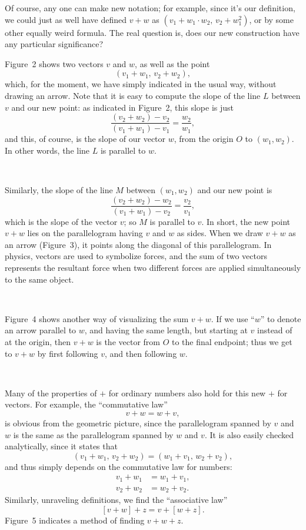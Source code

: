 Of course, any one can make new notation; for example, since it's our
definition, we could just as well have defined $v+w$ as
$(v_1+w_1\cdot w_2,\,v_2+w_1^2)$, or by some other equally weird formula. The
real question is, does our new construction have any particular significance?

Figure~2 shows two vectors $v$ and $w$, as well as the point
\[
(v_1+w_1,\,v_2+w_2),
\]
which, for the moment, we have simply indicated in the usual way, without
drawing an arrow. Note that it is easy to compute the slope of the line $L$
between $v$ and our new point: as indicated in Figure~2, this slope is just
\[
\frac{(v_2+w_2)-v_2}{(v_1+w_1)-v_1}=\frac{w_2}{w_1},
\]
and this, of course, is the slope of our vector $w$, from the origin $O$ to
$(w_1,w_2)$. In other words, the line $L$ is parallel to $w$.

\begin{center}
\\[0.6em]
\end{center}

Similarly, the slope of the line $M$ between $(w_1,w_2)$ and our new point is
\[
\frac{(v_2+w_2)-w_2}{(v_1+w_1)-v_2}=\frac{v_2}{v_1},
\]
which is the slope of the vector $v$; so $M$ is parallel to $v$. In short, the
new point $v+w$ lies on the parallelogram having $v$ and $w$ as sides. When we
draw $v+w$ as an arrow (Figure~3), it points along the diagonal of this
parallelogram. In physics, vectors are used to symbolize forces, and the sum of
two vectors represents the resultant force when two different forces are
applied simultaneously to the same object.

\begin{center}
\\[0.6em]
\end{center}

Figure~4 shows another way of visualizing the sum $v+w$. If we use ``$w$'' to
denote an arrow parallel to $w$, and having the same length, but starting at
$v$ instead of at the origin, then $v+w$ is the vector from $O$ to the final
endpoint; thus we get to $v+w$ by first following $v$, and then following $w$.

\begin{center}
\\[0.6em]
\end{center}

Many of the properties of $+$ for ordinary numbers also hold for this new $+$
for vectors. For example, the ``commutative law''
\[
v+w=w+v,
\]
is obvious from the geometric picture, since the parallelogram spanned by $v$
and $w$ is the same as the parallelogram spanned by $w$ and $v$. It is also
easily checked analytically, since it states that
\[
(v_1+w_1,\,v_2+w_2)=(w_1+v_1,\,w_2+v_2),
\]
and thus simply depends on the commutative law for numbers:
\begin{align*}
v_1+w_1&=w_1+v_1,\\
v_2+w_2&=w_2+v_2.
\end{align*}
Similarly, unraveling definitions, we find the ``associative law''
\[
[v+w]+z=v+[w+z].
\]
Figure~5 indicates a method of finding $v+w+z$.

